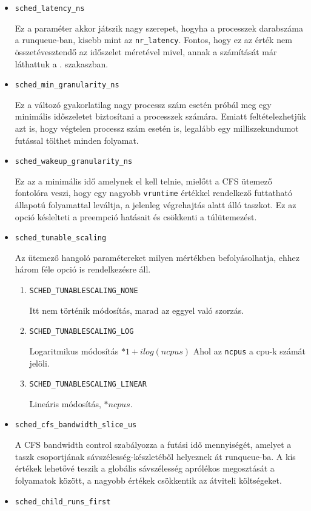 \begin{itemize}
\item \texttt{sched\_latency\_ns}

Ez a paraméter akkor játszik nagy szerepet, hogyha a processzek darabszáma a runqueue-ban, kisebb mint az \texttt{nr\_latency}. Fontos, hogy ez az érték nem összetévesztendő az időszelet méretével mivel, annak a számítását már láthattuk a . szakaszban. 

\item \texttt{sched\_min\_granularity\_ns}

Ez a változó gyakorlatilag nagy processz szám esetén próbál meg egy minimális időszeletet biztosítani a processzek számára. Emiatt feltételezhetjük azt is, hogy végtelen processz szám esetén is, legalább egy milliszekundumot futással tölthet minden folyamat.

\item \texttt{sched\_wakeup\_granularity\_ns}

Ez az a minimális idő amelynek el kell telnie, mielőtt a CFS ütemező fontolóra veszi, hogy egy nagyobb \texttt{vruntime} értékkel rendelkező futtatható állapotú folyamattal leváltja, a jelenleg végrehajtás alatt álló taszkot.
Ez az opció késlelteti a preempció hatásait és csökkenti a túlütemezést. 

\item \texttt{sched\_tunable\_scaling}

Az ütemező hangoló paramétereket milyen mértékben befolyásolhatja, ehhez három féle opció is rendelkezésre áll.
\begin{enumerate}
\item \texttt{SCHED\_TUNABLESCALING\_NONE}

Itt nem történik módosítás, marad az eggyel való szorzás.
\item \texttt{SCHED\_TUNABLESCALING\_LOG}

Logaritmikus módosítás $*1+ilog(ncpus)$
Ahol az \texttt{ncpus} a cpu-k számát jelöli.

\item \texttt{SCHED\_TUNABLESCALING\_LINEAR}

Lineáris módosítás, $*ncpus$. 
\end{enumerate}

\item \texttt{sched\_cfs\_bandwidth\_slice\_us}

A CFS bandwidth control szabályozza a futási idő mennyiségét, amelyet a taszk csoportjának sávszélesség-készletéből helyeznek át runqueue-ba. A kis értékek lehetővé teszik a globális sávszélesség aprólékos megosztását a folyamatok között, a nagyobb értékek csökkentik az átviteli költségeket.
\item \texttt{sched\_child\_runs\_first}


\end{itemize}
